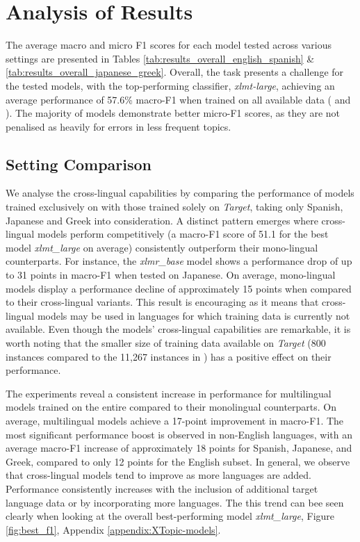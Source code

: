 \clearpage


\section{Analysis of Results}
\label{sec:results}
The average macro and micro F1 scores for each model tested across various settings are presented in Tables \ref{tab:results_overall_english_spanish} \& \ref{tab:results_overall_japanese_greek}. Overall, the task presents a challenge for the tested models, with the top-performing classifier, \textit{xlmt-large}, achieving an average performance of 57.6\% macro-F1 when trained on all available data ({\TweetTopic} and {\XTOPIC}). The majority of models demonstrate better micro-F1 scores, as they are not penalised as heavily for errors in less frequent topics. 


\subsection{Setting Comparison}

We analyse the cross-lingual capabilities by comparing the performance of models trained exclusively on {\TweetTopic} with those trained solely on \textit{Target}, taking only Spanish, Japanese and Greek into consideration. A distinct pattern emerges where cross-lingual models perform competitively (a macro-F1 score of 51.1 for the best model \textit{xlmt\_large} on average) consistently outperform their mono-lingual counterparts. For instance, the \textit{xlmr\_base} model shows a performance drop of up to 31 points in macro-F1 when tested on Japanese. On average, mono-lingual models display a performance decline of approximately 15 points when compared to their cross-lingual variants. This result is encouraging as it means that cross-lingual models may be used in languages for which training data is currently not available. Even though the models' cross-lingual capabilities are remarkable, it is worth noting that the smaller size of training data available on \textit{Target} (800 instances compared to the 11,267 instances in {\TweetTopic}) has a positive effect on their performance.



The experiments reveal a consistent increase in performance for multilingual models trained on the entire {\XTOPIC} compared to their monolingual counterparts. On average, multilingual models achieve a 17-point improvement in macro-F1. The most significant performance boost is observed in non-English languages, with an average macro-F1 increase of approximately 18 points for Spanish, Japanese, and Greek, compared to only 12 points for the English subset. In general, we observe that cross-lingual models tend to improve as more languages are added. Performance consistently increases with the inclusion of additional target language data or by incorporating more languages. The this trend can bee seen clearly when looking at the overall best-performing model \textit{xlmt\_large}, Figure \ref{fig:best_f1}, Appendix \ref{appendix:XTopic-models}.


